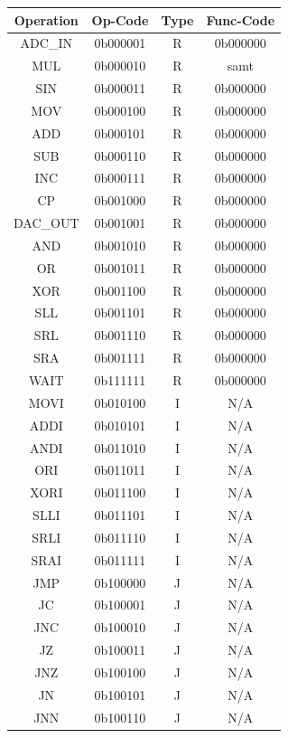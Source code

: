\begin{center}
	\begin{tabular}{ | c | c | c | c |}
		\hline
		Operation & Op-Code & Type & Func-Code \\
		\hline
		ADC\_IN	& 0b000001	& R	& 0b000000	\\
		MUL	& 0b000010	& R	& samt	\\
		SIN	& 0b000011	& R	& 0b000000	\\
		MOV	& 0b000100	& R	& 0b000000	\\
		ADD	& 0b000101	& R	& 0b000000	\\
		SUB	& 0b000110	& R	& 0b000000	\\
		INC	& 0b000111	& R	& 0b000000	\\
		CP	& 0b001000	& R	& 0b000000	\\
		DAC\_OUT	& 0b001001	& R	& 0b000000	\\
		AND	& 0b001010	& R	& 0b000000	\\
		OR	& 0b001011	& R	& 0b000000	\\
		XOR	& 0b001100	& R	& 0b000000	\\
		SLL	& 0b001101	& R	& 0b000000	\\
		SRL	& 0b001110	& R	& 0b000000	\\
		SRA	& 0b001111	& R	& 0b000000	\\
		WAIT	& 0b111111	& R	& 0b000000	\\
		MOVI	& 0b010100	& I	& N/A	\\
		ADDI	& 0b010101	& I	& N/A	\\
		ANDI	& 0b011010	& I	& N/A	\\
		ORI	& 0b011011	& I	& N/A	\\
		XORI	& 0b011100	& I	& N/A	\\
		SLLI	& 0b011101	& I	& N/A	\\
		SRLI	& 0b011110	& I	& N/A	\\
		SRAI	& 0b011111	& I	& N/A	\\
		JMP	& 0b100000	& J	& N/A	\\
		JC	& 0b100001	& J	& N/A	\\
		JNC	& 0b100010	& J	& N/A	\\
		JZ	& 0b100011	& J	& N/A	\\
		JNZ	& 0b100100	& J	& N/A	\\
		JN	& 0b100101	& J	& N/A	\\
		JNN	& 0b100110	& J	& N/A	\\
		\hline
	\end{tabular} 
\end{center}

